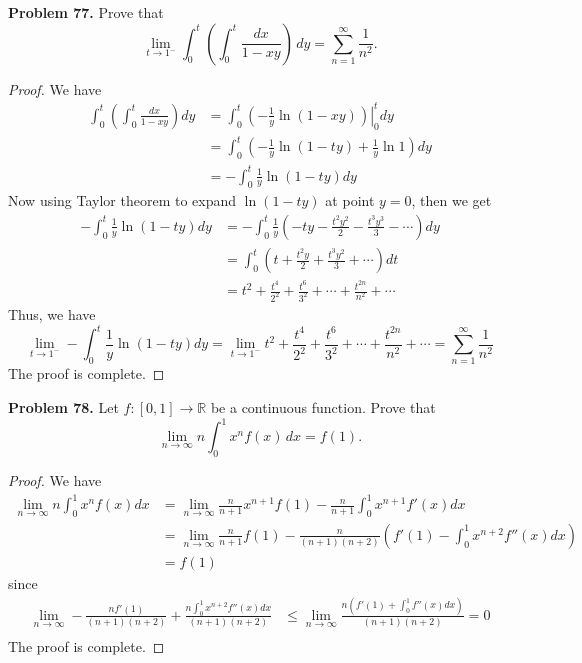 \documentclass[12pt,leqno]{amsart}
\begin{document}
\noindent
{\bf Problem 77.}
Prove that
$$
\lim_{t\to 1^-}\int_0^t\left(\int_0^t\frac{dx}{1-xy}\right)\, dy=\sum_{n=1}^\infty\frac{1}{n^2}.
$$
\begin{proof}
We have 
\begin{align*}
    \int_0^t\left(\int_0^t\frac{dx}{1-xy}\right) dy & = \int_0^t \left. \left(-\frac{1}{y}\ln (1-xy)\right)\right|^t_0 dy \\
    & = \int_0^t \left(-\frac{1}{y}\ln (1 - ty) + \frac{1}{y}\ln 1\right) dy \\
    & = - \int_0^t \frac{1}{y}\ln (1 - ty) dy
\end{align*}
Now using Taylor theorem to expand $\ln (1 - ty)$ at point $y=0$, then we get 
\begin{align*}
    - \int_0^t \frac{1}{y}\ln (1 - ty) dy & = - \int_0^t \frac{1}{y}\left(-ty - \frac{t^2y^2}{2} - \frac{t^3y^3}{3} - \cdots \right) dy \\
    & = \int_0^t \left(t + \frac{t^2y}{2} + \frac{t^3y^2}{3} + \cdots \right) dt \\
    & = t^2 + \frac{t^4}{2^2} + \frac{t^6}{3^2} + \cdots + \frac{t^{2n}}{n^2} +\cdots
\end{align*}
Thus, we have $$\lim_{t\to 1^-} - \int_0^t \frac{1}{y}\ln (1 - ty) dy = \lim_{t\to 1^-} t^2 + \frac{t^4}{2^2} + \frac{t^6}{3^2} + \cdots + \frac{t^{2n}}{n^2} +\cdots = \sum^\infty_{n=1}\frac{1}{n^2}$$ 
The proof is complete.
\end{proof}

\medskip

\noindent
{\bf Problem 78.}
Let $f:[0,1]\to\mathbb{R}$ be a continuous function. Prove that
$$
\lim_{n\to\infty} n\int_0^1 x^nf(x)\, dx=f(1).
$$
\begin{proof}
We have 
\begin{align*}
    \lim_{n\to\infty} n\int_0^1 x^nf(x) dx & = \lim_{n\to\infty} \frac{n}{n+1}x^{n+1}f(1) - \frac{n}{n+1}\int^1_0 x^{n+1}f'(x)dx \\
    & = \lim_{n\to\infty} \frac{n}{n+1}f(1) - \frac{n}{(n+1)(n+2)}\left(f'(1) - \int^1_0x^{n+2}f''(x)dx\right) \\
    & = f(1)
\end{align*}
since 
\begin{align*}
    \lim_{n\to\infty} - \frac{n f'(1)}{(n+1)(n+2)} + \frac{n\int^1_0x^{n+2}f''(x)dx}{(n+1)(n+2)} & \leq \lim_{n\to\infty} \frac{n(f'(1)+\int^1_0f''(x)dx)}{(n+1)(n+2)} = 0\\
\end{align*}
The proof is complete.
\end{proof}
\end{document}
